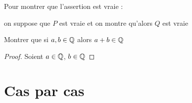\begin{frame}



Pour montrer que l'assertion  est vraie :

on suppose que $P$ est vraie et on montre qu'alors $Q$ est vraie


\pause
\medskip


\begin{exemple}
Montrer que si $a,b \in \mathbb{Q}$ alors $a+b\in \mathbb{Q}$
\end{exemple}

\pause

\begin{proof}
Soient $a\in \mathbb{Q}$, $b\in \mathbb{Q}$

\pause


\end{proof}

\end{frame}


\section{Cas par cas}

